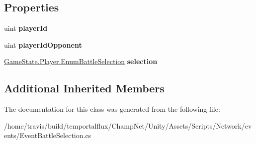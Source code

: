 \subsection*{Properties}
\begin{DoxyCompactItemize}
\item 
\hypertarget{class_event_battle_selection_acb6d735a144f55f502f35f3728e64fa7}{uint {\bfseries player\-Id}}\label{class_event_battle_selection_acb6d735a144f55f502f35f3728e64fa7}

\item 
\hypertarget{class_event_battle_selection_a4b91cf6aadc6b2c1073413811e764903}{uint {\bfseries player\-Id\-Opponent}}\label{class_event_battle_selection_a4b91cf6aadc6b2c1073413811e764903}

\item 
\hypertarget{class_event_battle_selection_afc0c2c21a8b44a5afc75a61df7a9597b}{\hyperlink{class_game_state_1_1_player_a9f54c5eca1e60acbaa2074e981f51615}{Game\-State.\-Player.\-Enum\-Battle\-Selection} {\bfseries selection}}\label{class_event_battle_selection_afc0c2c21a8b44a5afc75a61df7a9597b}

\end{DoxyCompactItemize}
\subsection*{Additional Inherited Members}


The documentation for this class was generated from the following file\-:\begin{DoxyCompactItemize}
\item 
/home/travis/build/temportalflux/\-Champ\-Net/\-Unity/\-Assets/\-Scripts/\-Network/events/Event\-Battle\-Selection.\-cs\end{DoxyCompactItemize}
